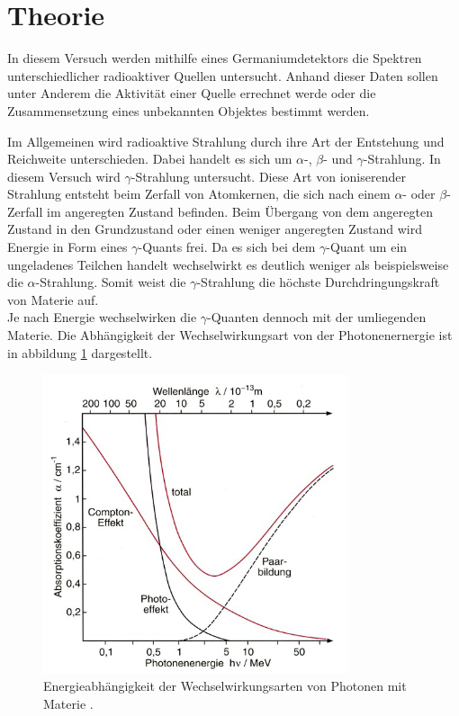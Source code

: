 \section{Theorie}
In diesem Versuch werden mithilfe eines Germaniumdetektors die Spektren
unterschiedlicher radioaktiver Quellen untersucht. Anhand dieser Daten sollen unter Anderem
die Aktivität einer Quelle errechnet werde oder die Zusammensetzung eines unbekannten Objektes bestimmt
werden.

Im Allgemeinen wird radioaktive Strahlung durch ihre Art der Entstehung und Reichweite unterschieden.
Dabei handelt es sich um $\alpha$-, $\beta$- und $\gamma$-Strahlung. In diesem Versuch wird $\gamma$-Strahlung
untersucht. Diese Art von ioniserender Strahlung entsteht beim Zerfall von Atomkernen, die sich nach einem $\alpha$- oder
$\beta$-Zerfall im angeregten Zustand befinden. Beim Übergang von dem angeregten Zustand in den Grundzustand oder einen
weniger angeregten Zustand wird Energie in Form eines $\gamma$-Quants frei. Da es sich bei dem $\gamma$-Quant um ein
ungeladenes Teilchen handelt wechselwirkt es deutlich weniger als beispielsweise die $\alpha$-Strahlung. Somit weist die
$\gamma$-Strahlung die höchste Durchdringungskraft von Materie auf. \\
Je nach Energie wechselwirken die $\gamma$-Quanten dennoch mit der umliegenden Materie.
Die Abhängigkeit der Wechselwirkungsart von der Photonenernergie ist in abbildung \ref{fig:WW}
dargestellt.
\begin{figure}[H]
    \centering
    \includegraphics[width=0.8\textwidth]{WW.png}
    \caption{Energieabhängigkeit der Wechselwirkungsarten von Photonen mit Materie \cite{WW}.}
    \label{fig:WW}
\end{figure} \noindent
